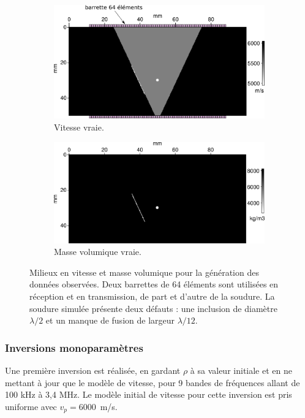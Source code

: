 \begin{figure}[!h]
	\centering
	\begin{subfigure}[b]{0.45\textwidth}
		\includegraphics[width=\textwidth]{img/milieux_ps/vp_true.png}
		\caption{Vitesse vraie.}
	\end{subfigure}
	\begin{subfigure}[b]{0.45\textwidth}
		\includegraphics[width=\textwidth]{img/milieux_ps/rho_true.png}
		\caption{Masse volumique vraie.}
	\end{subfigure}
	\caption{Milieux en vitesse et masse volumique pour la génération des données observées. Deux barrettes de 64 éléments sont utilisées en réception et en transmission, de part et d'autre de la soudure. La soudure simulée présente deux défauts : une inclusion de diamètre $\lambda/2$ et un manque de fusion de largeur $\lambda/12$.\label{app:iso:model}}
\end{figure}


\subsubsection{Inversions monoparamètres}

Une première inversion est réalisée, en gardant $\rho$ à sa valeur initiale et en ne mettant à jour que le modèle de vitesse, pour 9 bandes de fréquences allant de 100 kHz à 3,4 MHz. Le modèle initial de vitesse pour cette inversion est pris uniforme avec $v_{p}=6000$~m/s.\\

